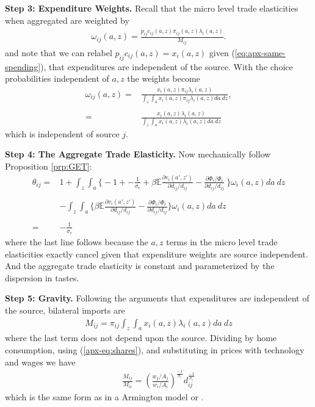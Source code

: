 \documentclass[12pt,pdftex]{article}
\begin{document}
\begin{onehalfspacing}
\textbf{Step 3: Expenditure Weights.} Recall that the micro level trade elasticities when aggregated are weighted by
\begin{align}
\omega_{ij}(a,z) = \frac{p_{ij}c_{ij}(a,z)\pi_{ij}(a,z) \lambda_{i}(a,z)}{M_{ij}}.
\end{align}
and note that we can relabel $p_{ij}c_{ij}(a,z) = x_{i}(a,z)$ given (\ref{eq:apx-same-spending}), that expenditures are independent of the source. With the choice probabilities independent of $a,z$ the weights become
\begin{align}
\omega_{ij}(a,z) =& \frac{x_{i}(a,z)\pi_{ij} \lambda_{i}(a,z)}{\int_{z}\int_{a}x_{i}(a,z)\pi_{ij} \lambda_{i}(a,z)da \ dz}, \\
\nonumber \\
=& \frac{x_{i}(a,z) \lambda_{i}(a,z)}{\int_{z}\int_{a} x_{i}(a,z) \lambda_{i}(a,z)da \ dz}
\end{align}
which is independent of source $j$.

\textbf{Step 4: The Aggregate Trade Elasticity.} Now mechanically follow Proposition \ref{prp:GET}:
\begin{align}
\nonumber
\theta_{ij} =& 1 + \int_{z}\int_{a} \bigg \{ -1 +  -\frac{1}{\sigma_{\epsilon}} + \beta \mathbb{E} \frac{\partial v_{i}(a',z')}{\partial d_{ij}/d_{ij}} -  \frac{\partial \Phi_{i} / \Phi_{i}}{\partial d_{ij}/d_{ij}} \  \bigg \}\omega_{i}(a,z)da \ dz \\
\nonumber \\
& - \int_{z}\int_{a} \bigg \{   \beta \mathbb{E} \frac{\partial v_{i}(a',z')}{\partial d_{ij}/d_{ij}} -  \frac{\partial \Phi_{i} / \Phi_{i}}{\partial d_{ij}/d_{ij}}  \bigg \}\omega_{i}(a,z)da \ dz \\
\nonumber \\
= & -\frac{1}{\sigma_{\epsilon}} \nonumber
\end{align}
where the last line follows because the $a,z$ terms in the micro level trade elasticities exactly cancel given that expenditure weights are source independent. And the aggregate trade elasticity is constant and parameterized by the dispersion in tastes.

\textbf{Step 5: Gravity.} Following the arguments that expenditures are independent of the source, bilateral imports are
\begin{align}
M_{ij} = \pi_{ij} \int_{z}\int_{a} x_{i}(a,z) \lambda_{i}(a,z)da \ dz
\end{align}
where the last term does not depend upon the source. Dividing by home consumption, using (\ref{apx-eq:shares}), and substituting in prices with technology and wages we have
\begin{align}
\frac{M_{ij}}{M_{ii}} = \left( \frac{  w_{j} / A_{j} }{  w_{i} / A_{i} } \right)^{\frac{-1}{\sigma_{\epsilon}}} d_{ij}^{\frac{-1}{\sigma_{\epsilon}}}
\end{align}
which is the same form as in a Armington model or \citet{eaton2002technology}.


\end{onehalfspacing}
\end{document}
